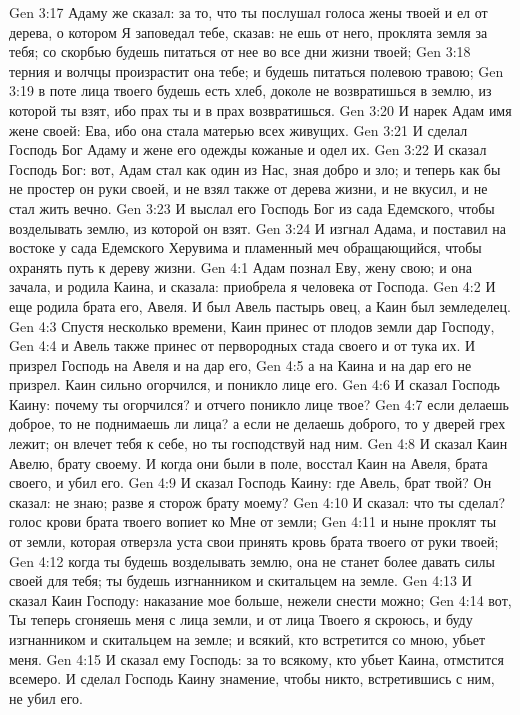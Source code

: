 Gen 3:17  Адаму же сказал: за то, что ты послушал голоса жены твоей и ел от дерева, о котором Я заповедал тебе, сказав: не ешь от него, проклята земля за тебя; со скорбью будешь питаться от нее во все дни жизни твоей;
Gen 3:18  терния и волчцы произрастит она тебе; и будешь питаться полевою травою;
Gen 3:19  в поте лица твоего будешь есть хлеб, доколе не возвратишься в землю, из которой ты взят, ибо прах ты и в прах возвратишься.
Gen 3:20  И нарек Адам имя жене своей: Ева, ибо она стала матерью всех живущих.
Gen 3:21  И сделал Господь Бог Адаму и жене его одежды кожаные и одел их.
Gen 3:22  И сказал Господь Бог: вот, Адам стал как один из Нас, зная добро и зло; и теперь как бы не простер он руки своей, и не взял также от дерева жизни, и не вкусил, и не стал жить вечно.
Gen 3:23  И выслал его Господь Бог из сада Едемского, чтобы возделывать землю, из которой он взят.
Gen 3:24  И изгнал Адама, и поставил на востоке у сада Едемского Херувима и пламенный меч обращающийся, чтобы охранять путь к дереву жизни.
Gen 4:1  Адам познал Еву, жену свою; и она зачала, и родила Каина, и сказала: приобрела я человека от Господа.
Gen 4:2  И еще родила брата его, Авеля. И был Авель пастырь овец, а Каин был земледелец.
Gen 4:3  Спустя несколько времени, Каин принес от плодов земли дар Господу,
Gen 4:4  и Авель также принес от первородных стада своего и от тука их. И призрел Господь на Авеля и на дар его,
Gen 4:5  а на Каина и на дар его не призрел. Каин сильно огорчился, и поникло лице его.
Gen 4:6  И сказал Господь Каину: почему ты огорчился? и отчего поникло лице твое?
Gen 4:7  если делаешь доброе, то не поднимаешь ли лица? а если не делаешь доброго, то у дверей грех лежит; он влечет тебя к себе, но ты господствуй над ним.
Gen 4:8  И сказал Каин Авелю, брату своему. И когда они были в поле, восстал Каин на Авеля, брата своего, и убил его.
Gen 4:9  И сказал Господь Каину: где Авель, брат твой? Он сказал: не знаю; разве я сторож брату моему?
Gen 4:10  И сказал: что ты сделал? голос крови брата твоего вопиет ко Мне от земли;
Gen 4:11  и ныне проклят ты от земли, которая отверзла уста свои принять кровь брата твоего от руки твоей;
Gen 4:12  когда ты будешь возделывать землю, она не станет более давать силы своей для тебя; ты будешь изгнанником и скитальцем на земле.
Gen 4:13  И сказал Каин Господу: наказание мое больше, нежели снести можно;
Gen 4:14  вот, Ты теперь сгоняешь меня с лица земли, и от лица Твоего я скроюсь, и буду изгнанником и скитальцем на земле; и всякий, кто встретится со мною, убьет меня.
Gen 4:15  И сказал ему Господь: за то всякому, кто убьет Каина, отмстится всемеро. И сделал Господь Каину знамение, чтобы никто, встретившись с ним, не убил его.
